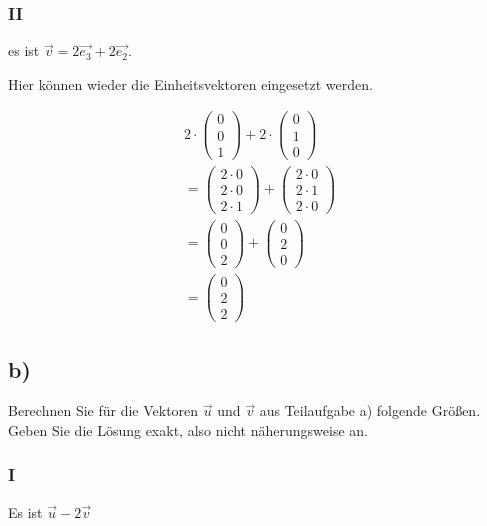 \subsubsection{II}
es ist $\vec{v} = 2\vec{e_3} + 2\vec{e_2}$.

Hier können wieder die Einheitsvektoren eingesetzt werden.

\begin{align*}
    2 \cdot \begin{pmatrix}
        0 \\ 0 \\ 1
    \end{pmatrix} + 2 \cdot \begin{pmatrix}
        0 \\ 1 \\ 0
    \end{pmatrix} \\
    = \begin{pmatrix}
        2 \cdot 0 \\ 2 \cdot 0 \\ 2 \cdot 1
    \end{pmatrix} + \begin{pmatrix}
        2 \cdot 0 \\ 2 \cdot 1 \\ 2 \cdot 0
    \end{pmatrix} \\
    = \begin{pmatrix}
        0 \\ 0 \\ 2
    \end{pmatrix} + \begin{pmatrix}
        0 \\ 2 \\ 0
    \end{pmatrix} \\
    = \begin{pmatrix}
        0 \\ 2 \\ 2
    \end{pmatrix}
\end{align*}

\subsection{b)}
Berechnen Sie für die Vektoren $\vec{u}$ und $\vec{v}$ aus Teilaufgabe a) folgende Größen.
Geben Sie die Lösung exakt, also nicht näherungsweise an.

\subsubsection{I}
Es ist $\vec{u} - 2\vec{v}$

